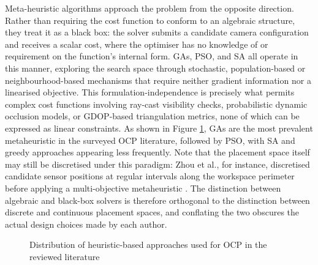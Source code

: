 Meta-heuristic algorithms approach the problem from the opposite direction. Rather than requiring the cost function to conform to an algebraic structure, they treat it as a black box: the solver submits a candidate camera configuration and receives a scalar cost, where the optimiser has no knowledge of or requirement on the function's internal form. \gls{GA}s, \gls{PSO}, and \gls{SA} all operate in this manner, exploring the search space through stochastic, population-based or neighbourhood-based mechanisms that require neither gradient information nor a linearised objective. This formulation-independence is precisely what permits complex cost functions involving ray-cast visibility checks, probabilistic dynamic occlusion models, or \gls{GDOP}-based triangulation metrics, none of which can be expressed as linear constraints. As shown in Figure \ref{fig: Heuristic Distribution}, \gls{GA}s are the most prevalent metaheuristic in the surveyed \gls{OCP} literature, followed by \gls{PSO}, with \gls{SA} and greedy approaches appearing less frequently. Note that the placement space itself may still be discretised under this paradigm: Zhou et al., for instance, discretised candidate sensor positions at regular intervals along the workspace perimeter before applying a multi-objective metaheuristic \parencite{zhouSensorPlacementOptimization2024}. The distinction between algebraic and black-box solvers is therefore orthogonal to the distinction between discrete and continuous placement spaces, and conflating the two obscures the actual design choices made by each author.

\begin{figure}[htbp]
    \centering
    \caption{Distribution of heuristic-based approaches used for OCP in the reviewed literature}
    \label{fig: Heuristic Distribution}
\end{figure}

